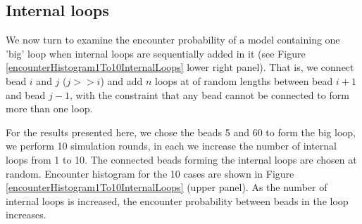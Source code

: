 \documentclass[12pt]{paper}
\begin{document}
\subsection{Internal loops}
We now turn to examine the encounter probability of a model containing one 'big' loop when internal loops are sequentially added in it (see Figure \ref{encounterHistogram1To10InternalLoops} lower right panel).  
That is, we connect bead $i$ and $j$ ($j>>i$) and add $n$ loops at of random lengths between bead $i+1$ and bead $j-1$, with the constraint that any bead cannot be connected to form more than one loop. 

For the results presented here, we chose the beads 5 and 60 to form the big loop, we perform 10 simulation rounds, in each we increase the number of internal loops from 1 to 10. The connected beads forming the internal loops are chosen at random. Encounter histogram for the 10 cases are shown in Figure \ref{encounterHistogram1To10InternalLoops} (upper panel). As the number of internal loops is increased, the encounter probability between beads in the loop increases.
\end{document}
